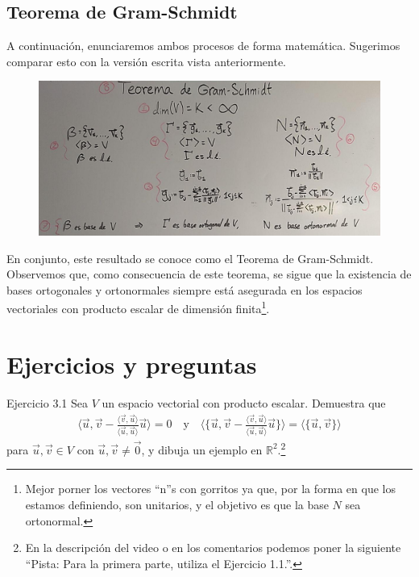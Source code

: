 \documentclass[12pt,dvipsnames]{article}
\numberwithin{equation}{section}
\begin{document}
\subsection{Teorema de Gram-Schmidt} \label{Ssec: Teorema de Gram-Schmidt}

A continuación, enunciaremos ambos procesos de forma matemática. Sugerimos comparar esto con la versión escrita vista anteriormente. 

\begin{figure}[h!]
    \centering
    \includegraphics[width=16cm]{2.png}
\end{figure}

En conjunto, este resultado se conoce como el Teorema de Gram-Schmidt. Observemos que, como consecuencia de este teorema, se sigue que la existencia de bases ortogonales y ortonormales siempre está asegurada en los espacios vectoriales con producto escalar de dimensión finita\footnote{Mejor porner los vectores ``n''s con gorritos ya que, por la forma en que los estamos definiendo, son unitarios, y el objetivo es que la base $N$ sea ortonormal.}.


\newpage
\section{Ejercicios y preguntas}

Ejercicio 3.1 Sea $V$ un espacio vectorial con producto escalar. Demuestra que
\begin{align*}
    \bigg\langle \vec{u}, \vec{v} - \frac{\langle \vec{v}, \vec{u}\rangle}{\langle \vec{u} , \vec{u} \rangle}\vec{u} \bigg\rangle = 0 \quad \text{y} \quad \bigg\langle \bigg\{\vec{u}, \vec{v} - \frac{\langle \vec{v}, \vec{u}\rangle}{\langle \vec{u} , \vec{u} \rangle}\vec{u} \bigg\} \bigg\rangle = \langle \{\vec{u}, \vec{v}\} \rangle
\end{align*} para $\vec{u},\vec{v}\in V$ con $\vec{u},\vec{v}\neq\vec{0}$, y dibuja un ejemplo en $\mathbb{R}^2$.\footnote{En la descripción del video o en los comentarios podemos poner la siguiente ``Pista: Para la primera parte, utiliza el Ejercicio 1.1.''.}\\
\end{document}
